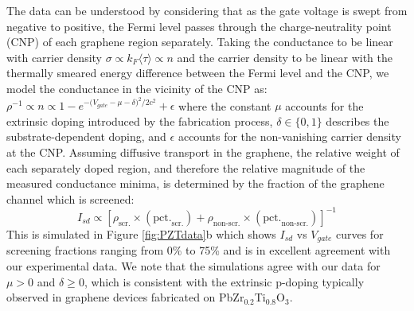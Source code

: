 \documentclass[edeposit,fullpage,draftthesis]{uiucthesis2009}
\begin{document}
The data can be understood by considering that as the gate voltage is swept from negative to positive, the Fermi level passes through the charge-neutrality point (CNP) of each graphene region separately. Taking the conductance to be linear with carrier density\cite{Hwang2007} $\sigma \propto k_F \langle\tau\rangle \propto n$ and the carrier density to be linear with the thermally smeared energy difference between the Fermi level and the CNP\cite{CastroNeto2009}, we model the conductance in the vicinity of the CNP as: $\rho^{-1} \propto n \propto 1 - e^{{-(V_{gate}}-\mu-\delta)^2/2c^2} + \epsilon$ where the constant $\mu$ accounts for the extrinsic doping introduced by the fabrication process, $\delta \in \{0,1\}$ describes the substrate-dependent doping, and $\epsilon$ accounts for the non-vanishing carrier density at the CNP. Assuming diffusive transport in the graphene, the relative weight of each separately doped region, and therefore the relative magnitude of the measured conductance minima, is determined by the fraction of the graphene channel which is screened:
$$I_{sd} \propto \left[ \rho_\text{scr.} \times (\text{pct.}_\text{scr.}) + \rho_\text{non-scr.} \times (\text{pct.}_\text{non-scr.}) \right]^{-1}$$
This is simulated in Figure \ref{fig:PZTdata}b which shows $I_{sd}$ vs $V_{gate}$ curves for screening fractions ranging from 0\% to 75\% and is in excellent agreement with our experimental data. We note that the simulations agree with our data for $\mu > 0$ and $\delta \geq 0$, which is consistent with the extrinsic p-doping typically observed in graphene devices fabricated on PbZr$_{0.2}$Ti$_{0.8}$O$_3$\cite{Baeumer2013}.
\end{document}
